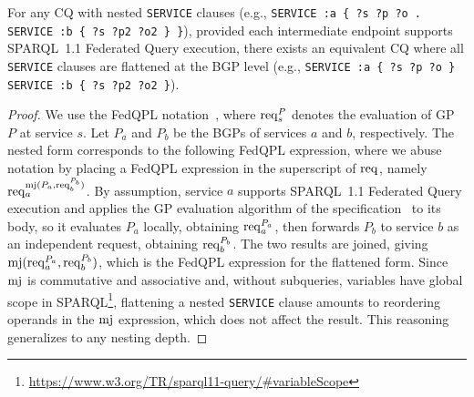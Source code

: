 \documentclass[../main]{subfiles}
\begin{document}
\begin{proposition}
For any \ac{CQ} with nested \texttt{SERVICE} clauses (e.g., \texttt{SERVICE :a \{ ?s ?p ?o . SERVICE :b \{ ?s ?p2 ?o2 \} \}}), provided each intermediate endpoint supports SPARQL~1.1 Federated Query execution, there exists an equivalent \ac{CQ} where all \texttt{SERVICE} clauses are flattened at the \ac{BGP} level (e.g., \texttt{SERVICE :a \{ ?s ?p ?o \} SERVICE :b \{ ?s ?p2 ?o2 \}}).
\end{proposition}

\begin{proof}
We use the FedQPL notation~\cite{Cheng2021}, where $\operatorname{req}_s^P$ denotes the evaluation of \ac{GP} $P$ at service $s$.
Let $P_a$ and $P_b$ be the \acp{BGP} of services $a$ and $b$, respectively.
The nested form corresponds to the following FedQPL expression, where we abuse notation by placing a FedQPL expression in the superscript of $\operatorname{req}$, namely $\operatorname{req}_a^{\operatorname{mj}(P_a, \operatorname{req}_b^{P_b})}$.
By assumption, service $a$ supports SPARQL~1.1 Federated Query execution and applies the \ac{GP} evaluation algorithm of the specification~\cite{w3SPARQLFederated} to its body, so it evaluates $P_a$ locally, obtaining $\operatorname{req}_a^{P_a}$, then forwards $P_b$ to service $b$ as an independent request, obtaining $\operatorname{req}_b^{P_b}$.
The two results are joined, giving $\operatorname{mj}(\operatorname{req}_a^{P_a}, \operatorname{req}_b^{P_b})$, which is the FedQPL expression for the flattened form.
Since $\operatorname{mj}$ is commutative and associative and, without subqueries, variables have global scope in SPARQL\footnote{\url{https://www.w3.org/TR/sparql11-query/\#variableScope}}, flattening a nested \texttt{SERVICE} clause amounts to reordering operands in the $\operatorname{mj}$ expression, which does not affect the result.
This reasoning generalizes to any nesting depth.
\end{proof}
\end{document}
